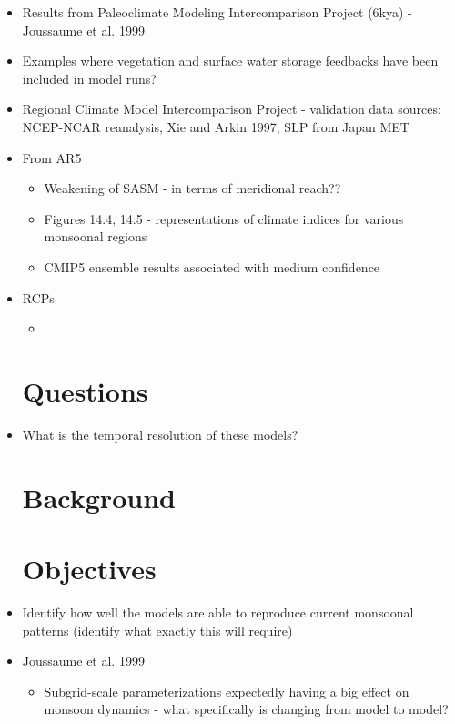 \documentclass[11pt,reqno]{amsart}
\begin{document}
\begin{itemize}
\item Results from Paleoclimate Modeling Intercomparison Project (6kya) - Joussaume et al. 1999 
\item Examples where vegetation and surface water storage feedbacks have been included in model runs?  

\item Regional Climate Model Intercomparison Project - validation data sources: NCEP-NCAR reanalysis, Xie and Arkin 1997, SLP from Japan MET 


\item From AR5
	\begin{itemize}
		\item Weakening of SASM - in terms of meridional reach?? 
		\item Figures 14.4, 14.5 - representations of climate indices for various monsoonal regions 
		\item CMIP5 ensemble results associated with medium confidence 
	\end{itemize}


\item RCPs
	\begin{itemize}
		\item  
	\end{itemize}


\section{Questions}
\item What is the temporal resolution of these models? 	
	
	



\section{Background}


\section{Objectives}
\item Identify how well the models are able to reproduce current monsoonal patterns (identify what exactly this will require) 

\item Joussaume et al. 1999 
	\begin{itemize}
	\item Subgrid-scale parameterizations expectedly having a big effect on monsoon dynamics - what specifically is changing from model to model?  
	

\end{itemize}
\end{itemize}
\end{document}
